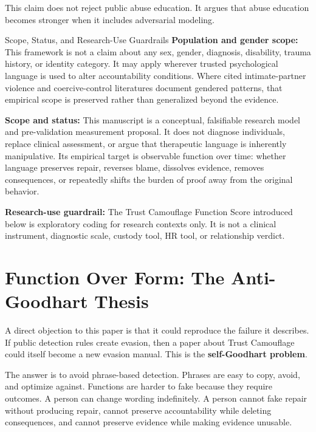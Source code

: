 \documentclass[11pt, letterpaper]{article}
\newcommand{\term}[1]{\textbf{#1}}
\begin{document}
This claim does not reject public abuse education. It argues that abuse education becomes stronger when it includes adversarial modeling.


\begin{frameworkbox}{Scope, Status, and Research-Use Guardrails}
\small
\term{Population and gender scope:} This framework is not a claim about any sex, gender, diagnosis, disability, trauma history, or identity category. It may apply wherever trusted psychological language is used to alter accountability conditions. Where cited intimate-partner violence and coercive-control literatures document gendered patterns, that empirical scope is preserved rather than generalized beyond the evidence.

\vspace{0.25em}
\term{Scope and status:} This manuscript is a conceptual, falsifiable research model and pre-validation measurement proposal. It does not diagnose individuals, replace clinical assessment, or argue that therapeutic language is inherently manipulative. Its empirical target is observable function over time: whether language preserves repair, reverses blame, dissolves evidence, removes consequences, or repeatedly shifts the burden of proof away from the original behavior.

\vspace{0.25em}
\term{Research-use guardrail:} The Trust Camouflage Function Score introduced below is exploratory coding for research contexts only. It is not a clinical instrument, diagnostic scale, custody tool, HR tool, or relationship verdict.
\end{frameworkbox}

\section{Function Over Form: The Anti-Goodhart Thesis}

A direct objection to this paper is that it could reproduce the failure it describes. If public detection rules create evasion, then a paper about Trust Camouflage could itself become a new evasion manual. This is the \term{self-Goodhart problem}.

The answer is to avoid phrase-based detection. Phrases are easy to copy, avoid, and optimize against. Functions are harder to fake because they require outcomes. A person can change wording indefinitely. A person cannot fake repair without producing repair, cannot preserve accountability while deleting consequences, and cannot preserve evidence while making evidence unusable.
\end{document}
